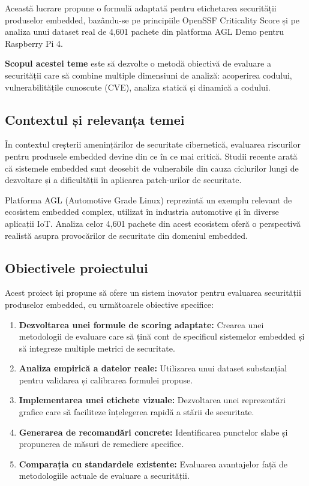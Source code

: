 \documentclass[12pt,a4paper]{article}
\begin{document}
Această lucrare propune o formulă adaptată pentru etichetarea securității produselor embedded, bazându-se pe principiile OpenSSF Criticality Score și pe analiza unui dataset real de 4,601 pachete din platforma AGL Demo pentru Raspberry Pi 4.

\textbf{Scopul acestei teme} este să dezvolte o metodă obiectivă de evaluare a securității care să combine multiple dimensiuni de analiză: acoperirea codului, vulnerabilitățile cunoscute (CVE), analiza statică și dinamică a codului.

\subsection{Contextul și relevanța temei}

În contextul creșterii amenințărilor de securitate cibernetică, evaluarea riscurilor pentru produsele embedded devine din ce în ce mai critică. Studii recente arată că sistemele embedded sunt deosebit de vulnerabile din cauza ciclurilor lungi de dezvoltare și a dificultății în aplicarea patch-urilor de securitate.

Platforma AGL (Automotive Grade Linux) reprezintă un exemplu relevant de ecosistem embedded complex, utilizat în industria automotive și în diverse aplicații IoT. Analiza celor 4,601 pachete din acest ecosistem oferă o perspectivă realistă asupra provocărilor de securitate din domeniul embedded.

\subsection{Obiectivele proiectului}

Acest proiect își propune să ofere un sistem inovator pentru evaluarea securității produselor embedded, cu următoarele obiective specifice:

\begin{enumerate}[label=\arabic*.]
    \item \textbf{Dezvoltarea unei formule de scoring adaptate:} Crearea unei metodologii de evaluare care să țină cont de specificul sistemelor embedded și să integreze multiple metrici de securitate.
    
    \item \textbf{Analiza empirică a datelor reale:} Utilizarea unui dataset substanțial pentru validarea și calibrarea formulei propuse.
    
    \item \textbf{Implementarea unei etichete vizuale:} Dezvoltarea unei reprezentări grafice care să faciliteze înțelegerea rapidă a stării de securitate.
    
    \item \textbf{Generarea de recomandări concrete:} Identificarea punctelor slabe și propunerea de măsuri de remediere specifice.
    
    \item \textbf{Comparația cu standardele existente:} Evaluarea avantajelor față de metodologiile actuale de evaluare a securității.
\end{enumerate}
\end{document}
